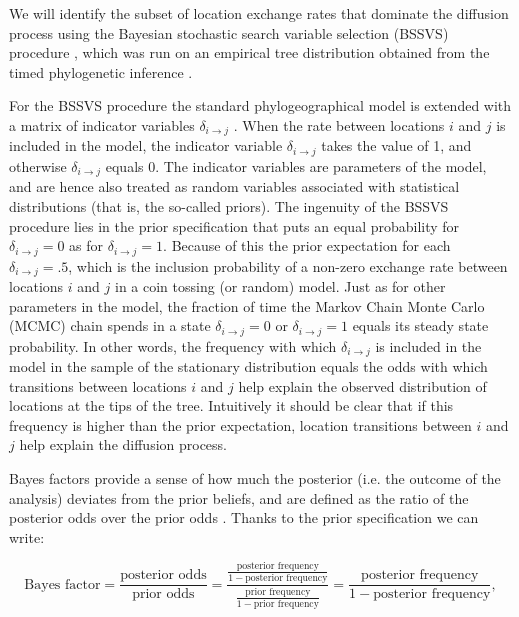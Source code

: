 \documentclass[english]{paper}
\begin{document}
We will identify the subset of location exchange rates that dominate the diffusion process using the Bayesian stochastic search variable selection (BSSVS) procedure \citep{lemey:2009fk}, which was run on an empirical tree distribution obtained from the timed phylogenetic inference \citep{Lemey:2014aa}. 
\par
For the BSSVS procedure the standard phylogeographical model is extended with a matrix of indicator variables $\delta_{i{\rightarrow}j}$ \citep{lemey:2009fk}.
When the rate between locations $i$ and $j$ is included in the model, the indicator variable $\delta_{i{\rightarrow}j}$ takes the value of 1, and otherwise $\delta_{i{\rightarrow}j}$ equals 0.
The indicator variables are parameters of the model, and are hence also treated as random variables associated with statistical distributions (that is, the so-called priors).
The ingenuity of the BSSVS procedure lies in the prior specification that puts an equal probability for $\delta_{i{\rightarrow}j} = 0$ as for $\delta_{i{\rightarrow}j} = 1$. 
Because of this the prior expectation for each $\delta_{i{\rightarrow}j} = .5$, which is the inclusion probability of a non-zero exchange rate between locations $i$ and $j$ in a coin tossing (or random) model.
Just as for other parameters in the model, the fraction of time the Markov Chain Monte Carlo (MCMC) chain spends in a state $\delta_{i{\rightarrow}j} = 0$ or $\delta_{i{\rightarrow}j} = 1$ equals its steady state probability.
In other words, the frequency with which $\delta_{i{\rightarrow}j}$ is included in the model in the sample of the stationary distribution equals the odds with which transitions between locations $i$ and $j$ help explain the observed distribution of locations at the tips of the tree.
Intuitively it should be clear that if this frequency is higher than the prior expectation, location transitions between $i$ and $j$ help explain the diffusion process.
\par
Bayes factors provide a sense of how much the posterior (i.e. the outcome of the analysis) deviates from the prior beliefs, and are defined as the ratio of the posterior odds over the prior odds \citep{kass:1995a}.
Thanks to the prior specification we can write:

$$ \text{Bayes factor} = \frac{ \text{posterior odds}}{\text{prior odds}} = \frac{\frac{\text{posterior frequency}}{1 - \text{posterior frequency}}}{\frac{\text{prior frequency}}{1 - \text{prior frequency}}} = \frac{\text{posterior frequency}}{1 - \text{posterior frequency}},$$
\end{document}
